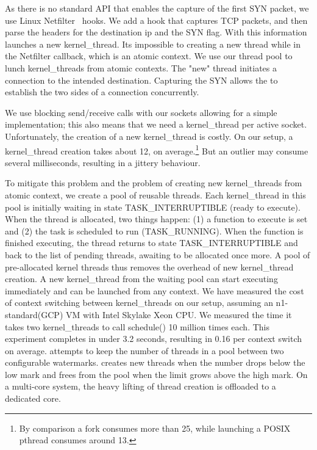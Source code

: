 As there is no standard API that enables the capture of the first SYN packet, we use Linux Netfilter~\cite{netfilter} hooks. We add a hook that captures TCP packets, and then parse the headers for the destination ip and the SYN flag. With this information \oursys launches a new kernel\_thread. Its impossible to creating a new thread while in the Netfilter callback, which is an atomic context. We use our thread pool to lunch kernel\_threads from atomic contexts. The "new" thread initiates a connection to the intended destination. Capturing the SYN allows the \relay to establish the two sides of a connection concurrently.

 We use blocking send/receive calls with our sockets allowing for a simple implementation; this also means that we need a kernel\_thread per active socket. Unfortunately, the creation of a new kernel\_thread is costly. On our setup, a kernel\_thread creation takes about 12\usec, on average.\footnote{By comparison a fork consumes more than 25\usec , while launching a POSIX pthread consumes around 13\usec.} But an outlier may consume several milliseconds, resulting in a jittery behaviour.

To mitigate this problem and the problem of creating new kernel\_threads from atomic context, we create a pool of reusable threads. Each kernel\_thread in this pool is initially waiting in state TASK\_INTERRUPTIBLE (ready to execute). When the thread is allocated, two things happen: (1) a function to execute is set and (2)  the task is scheduled to run (TASK\_RUNNING). When the function is finished executing, the thread returns to state TASK\_INTERRUPTIBLE and back to the list of pending threads, awaiting to be allocated once more. A pool of pre-allocated kernel threads thus removes the overhead of new kernel\_thread creation. A new kernel\_thread from the waiting pool can start executing immediately and can be launched from any context. We have measured the cost of context switching between kernel\_threads on our setup, assuming an n1-standard(GCP) VM with Intel Skylake Xeon CPU. We measured the time it takes two kernel\_threads to call schedule() 10 million times each. This experiment completes in under 3.2 seconds, resulting in 0.16 \usec per context switch on average. \oursys attempts to keep the number of threads in a pool between two configurable watermarks. \oursys creates new threads when the number drops below the low mark and frees from the pool when the limit grows above the high mark. On a multi-core system, the heavy lifting of thread creation is offloaded to a dedicated core.

